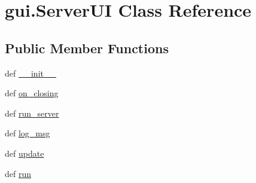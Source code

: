 \hypertarget{classgui_1_1_server_u_i}{\section{gui.\-Server\-U\-I \-Class \-Reference}
\label{classgui_1_1_server_u_i}
}
\subsection*{\-Public \-Member \-Functions}
\begin{DoxyCompactItemize}
\item 
def \hyperlink{classgui_1_1_server_u_i_a6da764733a334adb0221213dff8b2924}{\-\_\-\-\_\-init\-\_\-\-\_\-}
\item 
def \hyperlink{classgui_1_1_server_u_i_a96822e81dfe1c7c353cc2ea70401b15f}{on\-\_\-closing}
\item 
def \hyperlink{classgui_1_1_server_u_i_a1aedfa64270df069ac75263dfe8ec1e1}{run\-\_\-server}
\item 
def \hyperlink{classgui_1_1_server_u_i_a05dd1aad3f45403cbbf2f68219f8ef24}{log\-\_\-msg}
\item 
def \hyperlink{classgui_1_1_server_u_i_a9f0dd48de16df7215fb9c0961890755f}{update}
\item 
def \hyperlink{classgui_1_1_server_u_i_a17213f27e72cd109f0eafa5f4936034d}{run}
\end{DoxyCompactItemize}
